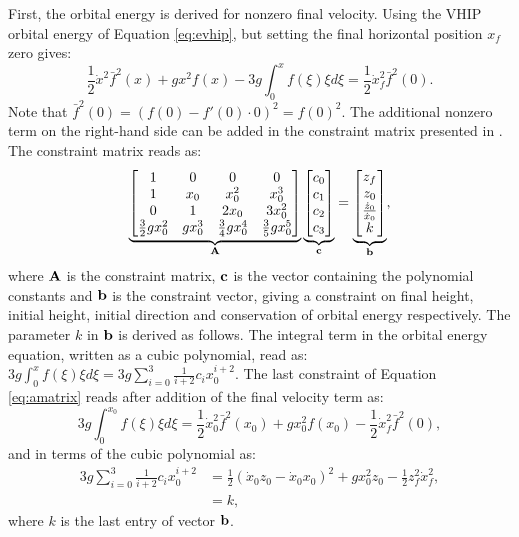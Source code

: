 First, the orbital energy is derived for nonzero final velocity. Using the \ac{VHIP} orbital energy of Equation \eqref{eq:evhip}, but setting the final horizontal position $x_f$ zero gives:
\begin{equation}
    \frac{1}{2}\dot{x}^2\bar{f}^2(x)+gx^2f(x) - 3g\int_{0}^xf(\xi)\xi d\xi = \frac{1}{2}\dot{x}_f^2\bar{f}^2(0).
\end{equation}
Note that $\bar{f}^2(0)=(f(0)-f'(0) \cdot 0)^2=f(0)^2$. The additional nonzero term on the right-hand side can be added in the constraint matrix presented in \cite{koolen2016balance}. The constraint matrix reads as:
\begin{equation}
    \underbrace{\begin{bmatrix}1 & 0 & 0 & 0 \\ 
     1 & x_0 & x_0^2 & x_0^3\\
     0 & 1 & 2x_0 & 3x_0^2\\
     \frac{3}{2}gx_0^2 & gx_0^3 & \frac{3}{4}gx_0^4 & \frac{3}{5}gx_0^5\\
     \end{bmatrix}}_{\mathbf{A}}
     \underbrace{\begin{bmatrix}
     c_0\\
     c_1\\
     c_2\\
     c_3\\
     \end{bmatrix}}_{\mathbf{c}}=
     \underbrace{\begin{bmatrix}
     z_f\\
     z_0\\
     \frac{\dot{z}_0}{\dot{x}_0}\\
     k\\
     \end{bmatrix}}_{\mathbf{b}},
     \label{eq:amatrix}
\end{equation}
where $\mathbf{A}$ is the constraint matrix, $\mathbf{c}$ is the vector containing the polynomial constants and $\mathbf{b}$ is the constraint vector, giving a constraint on final height, initial height, initial direction and conservation of orbital energy respectively.
The parameter $k$ in $\mathbf{b}$ is derived as follows. The integral term in the orbital energy equation, written as a cubic polynomial, read as: $3g\int_{0}^xf(\xi)\xi d\xi = 3g\sum_{i=0}^3\frac{1}{i+2}c_ix_0^{i+2}$. The last constraint of Equation \eqref{eq:amatrix} reads after addition of the final velocity term as:
\begin{equation}
		3g\int_{0}^{x_0}f(\xi)\xi d\xi =\frac{1}{2}\dot{x}_0^2\bar{f}^2(x_0)+gx_0^2f(x_0) - \frac{1}{2}\dot{x}_f^2\bar{f}^2(0),
\end{equation}
and in terms of the cubic polynomial as:
\begin{align}
	3g\sum_{i=0}^3\frac{1}{i+2}c_ix_0^{i+2}& = \frac{1}{2}(\dot{x}_0z_0-\dot{x}_0x_0)^2 + gx_0^2z_0 - \frac{1}{2}z_f^2\dot{x}_f^2,\\
	&=k,
\end{align}
where $k$ is the last entry of vector $\mathbf{b}$. 

